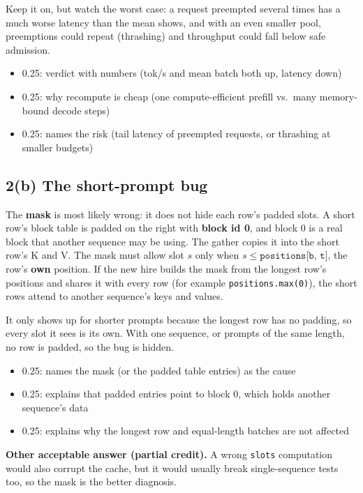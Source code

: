 \documentclass[10pt]{article}
\newenvironment{rubric}{%
  \begin{tcolorbox}[colback=black!4, colframe=black!40, boxrule=0.4pt,
                    arc=0pt, title={Rubric}, fonttitle=\bfseries\small,
                    coltitle=black, colbacktitle=black!12]
  \small\begin{itemize}[leftmargin=*, nosep]}{%
  \end{itemize}\end{tcolorbox}}
\begin{document}
Keep it on, but watch the worst case: a request preempted several times
has a much worse latency than the mean shows, and with an even smaller
pool, preemptions could repeat (thrashing) and throughput could fall below
safe admission.

\begin{rubric}
\item 0.25: verdict with numbers (tok/s and mean batch both up, latency down)
\item 0.25: why recompute is cheap (one compute-efficient prefill vs.\ many
  memory-bound decode steps)
\item 0.25: names the risk (tail latency of preempted requests, or
  thrashing at smaller budgets)
\end{rubric}

\subsection*{2(b) The short-prompt bug}

The \textbf{mask} is most likely wrong: it does not hide each row's padded
slots. A short row's block table is padded on the right with
\textbf{block id 0}, and block 0 is a real block that another sequence may
be using. The gather copies it into the short row's K and V. The mask must
allow slot $s$ only when $s \le \texttt{positions[b, t]}$, the row's
\textbf{own} position. If the new hire builds the mask from the longest
row's positions and shares it with every row (for example
\texttt{positions.max(0)}), the short rows attend to another sequence's
keys and values.

It only shows up for shorter prompts because the longest row has no
padding, so every slot it sees is its own. With one sequence, or prompts
of the same length, no row is padded, so the bug is hidden.

\begin{rubric}
\item 0.25: names the mask (or the padded table entries) as the cause
\item 0.25: explains that padded entries point to block 0, which holds
  another sequence's data
\item 0.25: explains why the longest row and equal-length batches are not
  affected
\end{rubric}

\textbf{Other acceptable answer (partial credit).} A wrong \texttt{slots}
computation would also corrupt the cache, but it would usually break
single-sequence tests too, so the mask is the better diagnosis.
\end{document}

